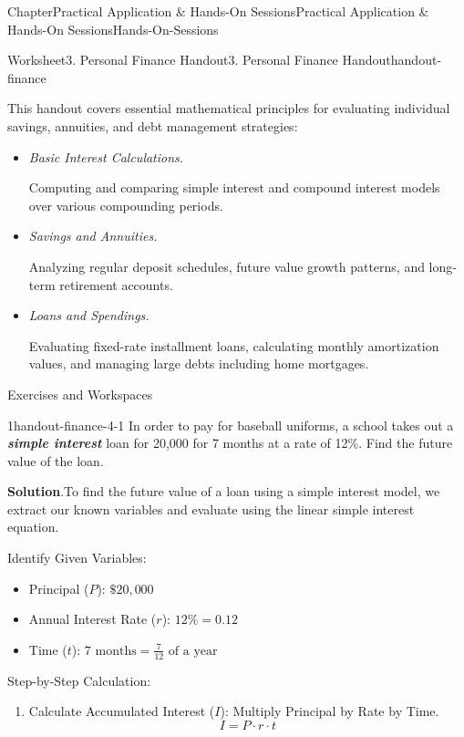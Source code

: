 \documentclass[oneside,10pt,]{book}
\newcommand{\blocktitlefont}{\relax}
\newcommand{\ptxlistdisc}{\raisebox{0.3ex}{\textbullet}}
\newcommand{\alert}[1]{\textbf{\textit{#1}}}
\newcommand{\lititle}[1]{{\slshape#1}}
\begin{document}
\begin{chapterptx}{Chapter}{Practical Application \& Hands-On Sessions}{}{Practical Application \& Hands-On Sessions}{}{}{Hands-On-Sessions}
\begin{worksheet-section}{Worksheet}{3. Personal Finance Handout}{}{3. Personal Finance Handout}{}{}{handout-finance}
\begin{introduction}{}%
This handout covers essential mathematical principles for evaluating individual savings, annuities, and debt management strategies:%
\par
%
\begin{itemize}[label=\ptxlistdisc]
\item{}\lititle{Basic Interest Calculations.}\par%
 Computing and comparing simple interest and compound interest models over various compounding periods.%
\item{}\lititle{Savings and Annuities.}\par%
 Analyzing regular deposit schedules, future value growth patterns, and long-term retirement accounts.%
\item{}\lititle{Loans and Spendings.}\par%
 Evaluating fixed-rate installment loans, calculating monthly amortization values, and managing large debts including home mortgages.%
\end{itemize}
%
\end{introduction}%
Exercises and Workspaces%
\begin{divisionexercise}{1}{}{}{handout-finance-4-1}%
In order to pay for baseball uniforms, a school takes out a \alert{simple interest} loan for \textdollar{}20,000 for 7 months at a rate of 12\%. Find the future value of the loan.%
\par\smallskip%
\noindent\textbf{\blocktitlefont Solution}.\hypertarget{handout-finance-4-1-2}{}\quad{}To find the future value of a loan using a simple interest model, we extract our known variables and evaluate using the linear simple interest equation.%
\par
Identify Given Variables:%
\begin{itemize}[label=\ptxlistdisc]
\item{}Principal (\(P\)): \(\$20,000\)%
\item{}Annual Interest Rate (\(r\)): \(12\% = 0.12\)%
\item{}Time (\(t\)): \(7 \text{ months} = \frac{7}{12} \text{ of a year}\)%
\end{itemize}
%
\par
Step-by-Step Calculation:%
\begin{enumerate}[label={(\alph*)}]
\item{}Calculate Accumulated Interest (\(I\)): Multiply Principal by Rate by Time.%
\begin{equation*}
I = P \cdot r \cdot t

\end{equation*}
\end{enumerate}
\end{divisionexercise}
\end{worksheet-section}
\end{chapterptx}
\end{document}
